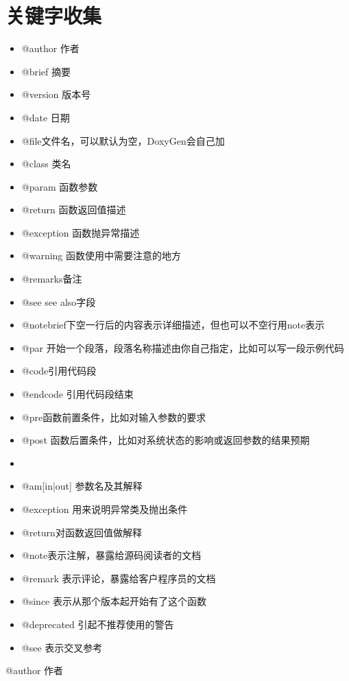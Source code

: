 \documentclass[a4paper]{ctexart}
\begin{document}
\section{关键字收集}%
\label{sec:guan_jian_zi_shou_ji_}

\begin{itemize}
  \item {\color{green}@author}  作者
  \item {\color{green}@brief}  摘要
  \item {\color{green}@version}  版本号
  \item {\color{green}@date}  日期
  \item {\color{green}@file}文件名，可以默认为空，DoxyGen会自己加
  \item {\color{green}@class}  类名
  \item {\color{green}@param         }函数参数
  \item {\color{green}@return}  函数返回值描述
  \item {\color{green}@exception}  函数抛异常描述
  \item {\color{green}@warning}  函数使用中需要注意的地方
  \item {\color{green}@remarks}备注
  \item {\color{green}@see}  see also字段
  \item {\color{green}@note}brief下空一行后的内容表示详细描述，但也可以不空行用note表示
  \item {\color{green}@par}  开始一个段落，段落名称描述由你自己指定，比如可以写一段示例代码
  \item {\color{green}@code}引用代码段
  \item {\color{green}@endcode}  引用代码段结束
  \item {\color{green}@pre}函数前置条件，比如对输入参数的要求
  \item {\color{green}@post}  函数后置条件，比如对系统状态的影响或返回参数的结果预期
  \item 
  \
  \item {\color{green}@}am[in|out]     参数名及其解释
  \item {\color{green}@exception}  用来说明异常类及抛出条件
  \item {\color{green}@return}对函数返回值做解释
  \item {\color{green}@note}表示注解，暴露给源码阅读者的文档
  \item {\color{green}@remark}  表示评论，暴露给客户程序员的文档
  \item {\color{green}@since}  表示从那个版本起开始有了这个函数
  \item {\color{green}@deprecated}  引起不推荐使用的警告
  \item {\color{green}@see}  表示交叉参考
 
\end{itemize}
@author       作者
\end{document}
